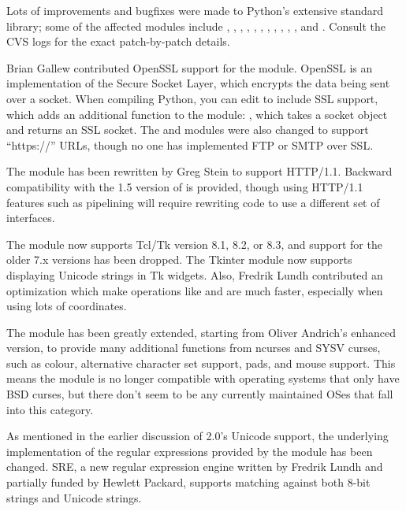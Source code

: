 \documentclass{howto}
\begin{document}
Lots of improvements and bugfixes were made to Python's extensive
standard library; some of the affected modules include
, , ,
, , , ,
, , , ,
and .  Consult the CVS logs for the exact
patch-by-patch details.  

Brian Gallew contributed OpenSSL support for the 
module.  OpenSSL is an implementation of the Secure Socket Layer,
which encrypts the data being sent over a socket.  When compiling
Python, you can edit  to include SSL support,
which adds an additional function to the  module:
,
which takes a socket object and returns an SSL socket.  The
 and  modules were also changed to
support ``https://'' URLs, though no one has implemented FTP or SMTP
over SSL.  

The  module has been rewritten by Greg Stein to
support HTTP/1.1.  Backward compatibility with the 1.5 version of
 is provided, though using HTTP/1.1 features such as
pipelining will require rewriting code to use a different set of
interfaces.

The  module now supports Tcl/Tk version 8.1, 8.2, or
8.3, and support for the older 7.x versions has been dropped.  The
Tkinter module now supports displaying Unicode strings in Tk widgets.
Also, Fredrik Lundh contributed an optimization which make operations
like  and  are much faster,
especially when using lots of coordinates.

The  module has been greatly extended, starting from
Oliver Andrich's enhanced version, to provide many additional
functions from ncurses and SYSV curses, such as colour, alternative
character set support, pads, and mouse support.  This means the module
is no longer compatible with operating systems that only have BSD
curses, but there don't seem to be any currently maintained OSes that
fall into this category.

As mentioned in the earlier discussion of 2.0's Unicode support, the
underlying implementation of the regular expressions provided by the
 module has been changed.  SRE, a new regular expression
engine written by Fredrik Lundh and partially funded by Hewlett
Packard, supports matching against both 8-bit strings and Unicode
strings.
\end{document}
